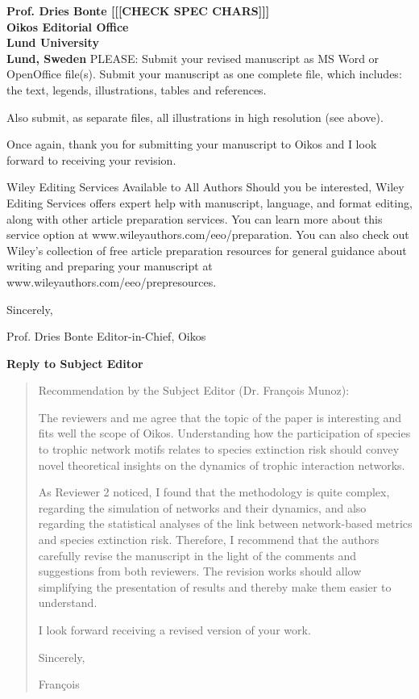 \documentclass[12pt]{letter}
\begin{document}
\begin{letter}{\bf Prof. Dries Bonte [[[CHECK SPEC CHARS]]]\\
Oikos Editorial Office \\
Lund University \\
Lund, Sweden}
PLEASE: Submit your revised manuscript as MS Word or OpenOffice file(s). Submit your manuscript as one complete file, which includes: the text, legends, illustrations, tables and references.

Also submit, as separate files, all illustrations in high resolution (see above).

Once again, thank you for submitting your manuscript to Oikos and I look forward to receiving your revision.

Wiley Editing Services Available to All Authors
Should you be interested, Wiley Editing Services offers expert help with manuscript, language, and format editing, along with other article preparation services. You can learn more about this service option at www.wileyauthors.com/eeo/preparation. You can also check out Wiley’s collection of free article preparation resources for general guidance about writing and preparing your manuscript at www.wileyauthors.com/eeo/prepresources.

Sincerely,

Prof. Dries Bonte
Editor-in-Chief, Oikos




\clearpage

\Large{\textbf{Reply to Subject Editor}}

    
    \begin{quotation}    
  Recommendation by the Subject Editor (Dr. François Munoz):

  The reviewers and me agree that the topic of the paper is interesting and fits well the scope of Oikos.
  Understanding how the participation of species to trophic network motifs relates to species extinction risk should convey novel theoretical insights on the dynamics of trophic interaction networks.

  As Reviewer 2 noticed, I found that the methodology is quite complex, regarding the simulation of networks and their dynamics, and also regarding the statistical analyses of the link between network-based metrics and species extinction risk.
  Therefore, I recommend that the authors carefully revise the manuscript in the light of the comments and suggestions from both reviewers. The revision works should allow simplifying the presentation of results and thereby make them easier to understand.

  I look forward receiving a revised version of your work.

  Sincerely,

  François
  \end{quotation}
  

\end{letter}
\end{document}
